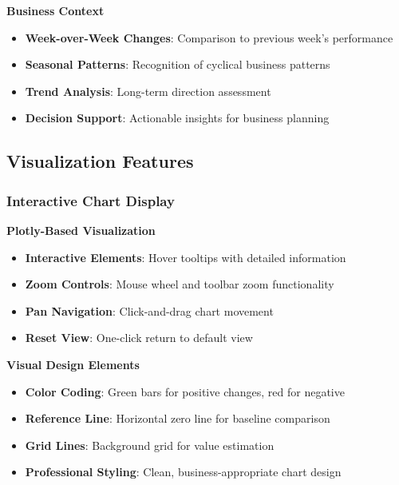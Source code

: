 \textbf{Business Context}
\begin{itemize}
	\item \textbf{Week-over-Week Changes}: Comparison to previous week's performance
	\item \textbf{Seasonal Patterns}: Recognition of cyclical business patterns
	\item \textbf{Trend Analysis}: Long-term direction assessment
	\item \textbf{Decision Support}: Actionable insights for business planning
\end{itemize}

\subsection{Visualization Features}

\subsubsection{Interactive Chart Display}

\textbf{Plotly-Based Visualization}
\begin{itemize}
	\item \textbf{Interactive Elements}: Hover tooltips with detailed information
	\item \textbf{Zoom Controls}: Mouse wheel and toolbar zoom functionality
	\item \textbf{Pan Navigation}: Click-and-drag chart movement
	\item \textbf{Reset View}: One-click return to default view
\end{itemize}

\textbf{Visual Design Elements}
\begin{itemize}
	\item \textbf{Color Coding}: Green bars for positive changes, red for negative
	\item \textbf{Reference Line}: Horizontal zero line for baseline comparison
	\item \textbf{Grid Lines}: Background grid for value estimation
	\item \textbf{Professional Styling}: Clean, business-appropriate chart design
\end{itemize}

